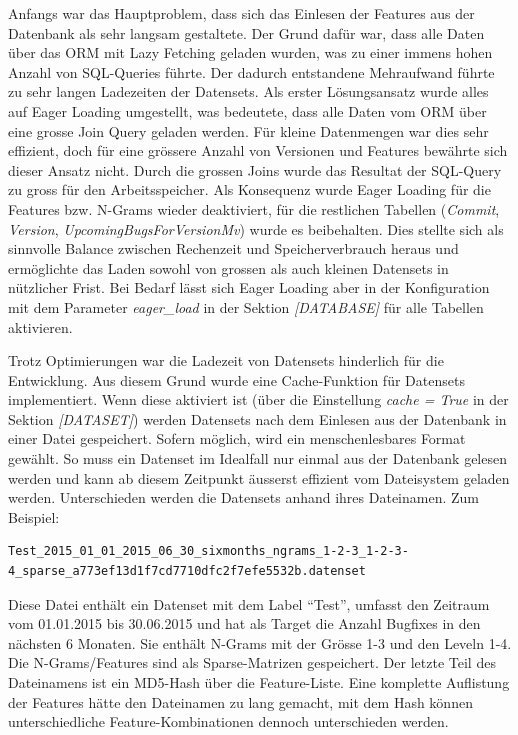 \documentclass[10pt, a4paper]{article}
\begin{document}
Anfangs war das Hauptproblem, dass sich das Einlesen der Features aus der Datenbank als sehr langsam gestaltete. Der Grund dafür war, dass alle Daten über das \ac{ORM} mit Lazy Fetching geladen wurden, was zu einer immens hohen Anzahl von SQL-Queries führte. Der dadurch entstandene Mehraufwand führte zu sehr langen Ladezeiten der Datensets. Als erster Lösungsansatz wurde alles auf Eager Loading umgestellt, was bedeutete, dass alle Daten vom \ac{ORM} über eine grosse Join Query geladen werden. Für kleine Datenmengen war dies sehr effizient, doch für eine grössere Anzahl von Versionen und Features bewährte sich dieser Ansatz nicht. Durch die grossen Joins wurde das Resultat der SQL-Query zu gross für den Arbeitsspeicher. Als Konsequenz wurde Eager Loading für die Features bzw. N-Grams wieder deaktiviert, für die restlichen Tabellen (\emph{Commit}, \emph{Version}, \emph{UpcomingBugsForVersionMv}) wurde es beibehalten. Dies stellte sich als sinnvolle Balance zwischen Rechenzeit und Speicherverbrauch heraus und ermöglichte das Laden sowohl von grossen als auch kleinen Datensets in nützlicher Frist. Bei Bedarf lässt sich Eager Loading aber in der Konfiguration mit dem Parameter \emph{eager\_load} in der Sektion \emph{[DATABASE]} für alle Tabellen aktivieren.

Trotz Optimierungen war die Ladezeit von Datensets hinderlich für die Entwicklung. Aus diesem Grund wurde eine Cache-Funktion für Datensets implementiert. Wenn diese aktiviert ist (über die Einstellung \emph{cache = True} in der Sektion \emph{[DATASET]}) werden Datensets nach dem Einlesen aus der Datenbank in einer Datei gespeichert. Sofern möglich, wird ein menschenlesbares Format gewählt. So muss ein Datenset im Idealfall nur einmal aus der Datenbank gelesen werden und kann ab diesem Zeitpunkt äusserst effizient vom Dateisystem geladen werden. Unterschieden werden die Datensets anhand ihres Dateinamen. Zum Beispiel:

\begin{lstlisting}[breaklines=true,caption={Datenset Dateiname}]
Test_2015_01_01_2015_06_30_sixmonths_ngrams_1-2-3_1-2-3-4_sparse_a773ef13d1f7cd7710dfc2f7efe5532b.datenset
\end{lstlisting}

Diese Datei enthält ein Datenset mit dem Label ``Test'', umfasst den Zeitraum vom 01.01.2015 bis 30.06.2015 und hat als Target die Anzahl Bugfixes in den nächsten 6 Monaten. Sie enthält N-Grams mit der Grösse 1-3 und den Leveln 1-4. Die N-Grams/Features sind als Sparse-Matrizen gespeichert. Der letzte Teil des Dateinamens ist ein MD5-Hash über die Feature-Liste. Eine komplette Auflistung der Features hätte den Dateinamen zu lang gemacht, mit dem Hash können unterschiedliche Feature-Kombinationen dennoch unterschieden werden.
\end{document}
